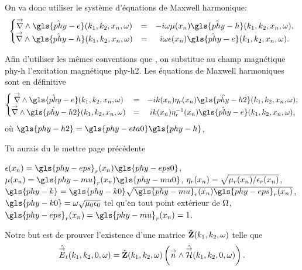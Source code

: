 On va donc utiliser le système d'équations de Maxwell harmonique:
\begin{equation}
    \left\lbrace
    \begin{matrix}
    \vrot \hat{\gls{phy-e}}(k_1,k_2,x_n,\w)  &=& -i \omega \mu(x_n) \hat{\gls{phy-h}}(k_1,k_2,x_n,\w),
    \\
    \vrot \hat{\gls{phy-h}}(k_1,k_2,x_n,\w)  &=& i \omega \eps(x_n) \hat{\gls{phy-e}}(k_1,k_2,x_n,\w).
    \end{matrix}
    \right.
    \label{eq:imp_fourier:intro:maxwell_harmonique}
\end{equation}

Afin d'utiliser les mêmes conventions que \cite{stupfel_implementation_2015}, on substitue au champ magnétique \gls{phy-h} l’excitation magnétique \gls{phy-h2}. Les équations de Maxwell harmoniques sont en définitive
\begin{equation}
    \left\lbrace
    \begin{matrix}
    \vrot \hat{\gls{phy-e}}(k_1,k_2,x_n,\w)  &=& -i k(x_n) \eta_r(x_n) \hat{\gls{phy-h2}}(k_1,k_2,x_n,\w),  \\
    \vrot \hat{\gls{phy-h2}}(k_1,k_2,x_n,\w)  &=& i k(x_n) \eta_r^{-1}(x_n) \hat{\gls{phy-e}}(k_1,k_2,x_n,\w),
    \end{matrix}
    \right.
    \label{eq:imp_fourier:intro:maxwell_harmonique:form_cea}
\end{equation}
où \(\gls{phy-h2} = \gls{phy-eta0} \gls{phy-h}\),
\begin{REM}
Tu aurais du le mettre page précédente
\end{REM}
\(\eps(x_n)=\gls{phy-eps}_r(x_n)\gls{phy-eps0}\), \(\mu(x_n)=\gls{phy-mu}_r(x_n)\gls{phy-mu0}\), \(\eta_r(x_n)=\sqrt{\mu_r(x_n)/\epsilon_r(x_n)}\), \(\gls{phy-k}=\gls{phy-k0}\sqrt{\gls{phy-mu}_r(x_n)\gls{phy-eps}_r(x_n)}\), \(\gls{phy-k0} = \w\sqrt{\mu_0\eps_0}\) tel qu'en tout point extérieur de \(\Omega\), \(\gls{phy-eps}_r(x_n) = \gls{phy-mu}_r(x_n)= 1\).

Notre but est de prouver l'existence d'une matrice \(\hat{\mathbf{Z}}(k_1,k_2,\omega)\) telle que
\begin{equation*}
    \hat{{\overset{\rightarrow}{E}}}_t(k_1,k_2,0,\omega) =  \hat{\mathbf{Z}}(k_1,k_2,\omega) \left({\overset{\rightarrow}{n}} \wedge \hat{{\overset{\rightarrow}{\mathcal{H}}}}(k_1,k_2,0,\omega) \right).
\end{equation*}

